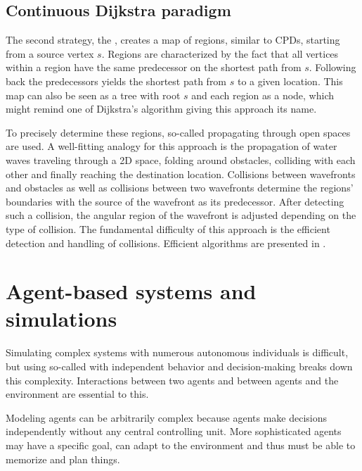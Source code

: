 	\subsection{Continuous Dijkstra paradigm}
	\label{subsec:continuous-dijkstra}
	
		The second strategy, the , creates a map of regions, similar to CPDs, starting from a source vertex $s$.
		Regions are characterized by the fact that all vertices within a region have the same predecessor on the shortest path from $s$.
		Following back the predecessors yields the shortest path from $s$ to a given location.
		This map can also be seen as a tree with root $s$ and each region as a node, which might remind one of Dijkstra's algorithm giving this approach its name\cite{mitchell-discrete-geodesic}.
		
		To precisely determine these regions, so-called  propagating through open spaces are used.
		A well-fitting analogy for this approach is the propagation of water waves traveling through a 2D space, folding around obstacles, colliding with each other and finally reaching the destination location.
		Collisions between wavefronts and obstacles as well as collisions between two wavefronts determine the regions' boundaries with the source of the wavefront as its predecessor.
		After detecting such a collision, the angular region of the wavefront is adjusted depending on the type of collision.
		The fundamental difficulty of this approach is the efficient detection and handling of collisions.
		Efficient algorithms are presented in .

\section{Agent-based systems and simulations}

	Simulating complex systems with numerous autonomous individuals is difficult, but using so-called  with independent behavior and decision-making breaks down this complexity\cite{macal-introductory-tutorial}.
	Interactions between two agents and between agents and the environment are essential to this.
	
	Modeling agents can be arbitrarily complex because agents make decisions independently without any central controlling unit.
	More sophisticated agents may have a specific goal, can adapt to the environment and thus must be able to memorize and plan things.
	

